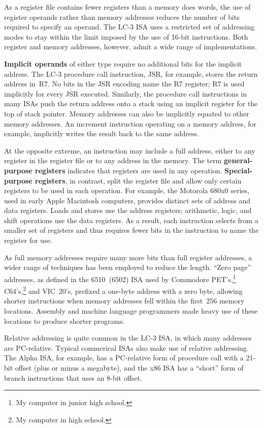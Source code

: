 As a register file contains fewer registers than a memory does words,
the use of register operands rather than memory addresses reduces the
number of bits required to specify an operand.  The \mbox{LC-3} ISA
uses a restricted set of addressing modes to stay within the limit
imposed by the use of \mbox{16-bit} instructions.  Both
register and memory addresses, however, admit a wide range of
implementations.

{\bf Implicit operands} of either type require no additional bits for
the implicit address.  The \mbox{LC-3} procedure call instruction, JSR,
for example, stores the return address in~R7.  No bits in the JSR 
encoding name the R7 register; R7 is used implicitly for every JSR
executed.
%
Similarly, the procedure call instructions in many ISAs push the 
return address onto a stack using an implicit register for the top 
of stack pointer.
%
Memory addresses can also be implicitly equated to other memory
addresses.  An increment instruction operating on a memory address, for
example, implicitly writes the result back to the same address.  

At the opposite extreme, an instruction may include a full address,
either to any register in the register file or to any address in the 
memory.  The term {\bf general-purpose registers} indicates that 
registers are used in any operation.
%
{\bf Special-purpose registers}, in contrast, split the register file
and allow only certain registers to be used in each operation.  For
example, the Motorola 680x0 series, used in early Apple
Macintosh computers, provides distinct sets of address and data
registers.  Loads and stores use the address registers; arithmetic,
logic, and shift operations use the data registers.  As a result, 
each instruction
selects from a smaller set of registers and thus requires fewer bits
in the instruction to name the register for use.

As full memory addresses require many more bits than full register
addresses, a wider range of techniques has been employed to reduce the
length.  ``Zero page'' addresses, as defined in the 6510~(6502) ISA
used by Commodore PET's,\footnote{My computer in junior high school.}
C64's,\footnote{My computer in high school.} and VIC~20's, prefixed a
one-byte address with a zero byte, allowing shorter instructions when
memory addresses fell within the first~256 memory locations.  Assembly
and machine language programmers made heavy use of these locations to
produce shorter programs.  

Relative addressing is quite common in the \mbox{LC-3} ISA, in which many
addresses are PC-relative.  Typical commerical ISAs also make use of
relative addressing.  The Alpha ISA, for example, has a PC-relative form of
procedure call with a \mbox{21-bit} offset (plus or minus a megabyte),
and the x86 ISA has a ``short'' form of branch instructions that
uses an \mbox{8-bit} offset.

